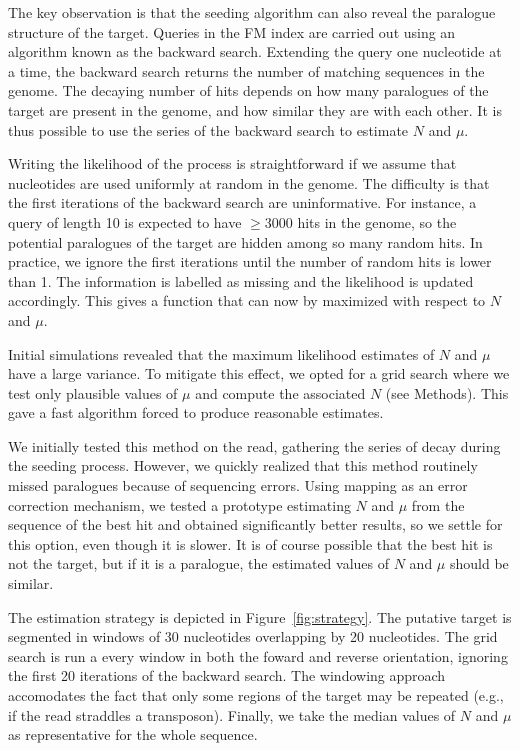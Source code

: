 \documentclass[a4,center,fleqn]{NAR}
\begin{document}
The key observation is that the seeding algorithm can also reveal the
paralogue structure of the target. Queries in the FM index are carried out
using an algorithm known as the backward search. Extending the query one
nucleotide at a time, the backward search returns the number of matching
sequences in the genome. The decaying number of hits depends on how many
paralogues of the target are present in the genome, and how similar they
are with each other. It is thus possible to use the series of the backward
search to estimate $N$ and $\mu$.

Writing the likelihood of the process is straightforward if we assume that
nucleotides are used uniformly at random in the genome. The difficulty is
that the first iterations of the backward search are uninformative. For
instance, a query of length 10 is expected to have $\geq 3000$ hits in
the genome, so the potential paralogues of the target are hidden among so
many random hits. In practice, we ignore the first iterations until the
number of random hits is lower than 1. The information is labelled as
missing and the likelihood is updated accordingly. This gives a function
that can now by maximized with respect to $N$ and $\mu$.

Initial simulations revealed that the maximum likelihood estimates of $N$
and $\mu$ have a large variance. To mitigate this effect, we opted for a
grid search where we test only plausible values of $\mu$ and compute the
associated $N$ (see Methods). This gave a fast algorithm forced to produce
reasonable estimates.

We initially tested this method on the read, gathering the series of decay
during the seeding process. However, we quickly realized that this method
routinely missed paralogues because of sequencing errors. Using mapping as
an error correction mechanism, we tested a prototype estimating $N$ and
$\mu$ from the sequence of the best hit and obtained significantly better
results, so we settle for this option, even though it is slower. It is of
course possible that the best hit is not the target, but if it is a
paralogue, the estimated values of $N$ and $\mu$ should be similar.

The estimation strategy is depicted in Figure~\ref{fig:strategy}. The
putative target is segmented in windows of 30 nucleotides overlapping by
20 nucleotides. The grid search is run a every window in both the foward
and reverse orientation, ignoring the first 20 iterations of the backward
search. The windowing approach accomodates the fact that only some
regions of the target may be repeated (e.g., if the read straddles a
transposon). Finally, we take the median values of $N$ and $\mu$ as
representative for the whole sequence.
\end{document}
